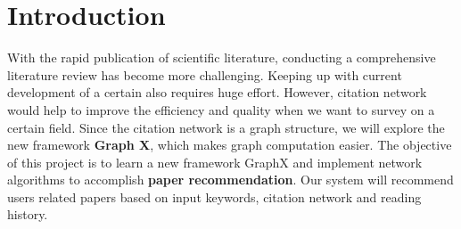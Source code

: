 \section{Introduction}

With the rapid publication of scientific literature, conducting a comprehensive literature review has become more challenging. Keeping up with current development of a certain also requires huge effort. However, citation network would help to improve the efficiency and quality when we want to survey on a certain field. Since the citation network is a graph structure, we will explore the new framework \textbf{Graph X}, which makes graph computation easier. The objective of this project is to learn a new framework GraphX and implement network algorithms to accomplish \textbf{paper recommendation}. Our system will recommend users related papers based on input keywords, citation network and reading history. 